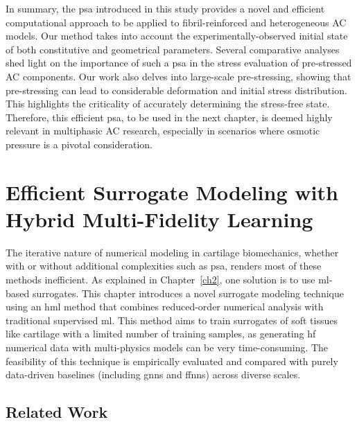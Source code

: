 In summary, the \ac{psa} introduced in this study provides a novel and efficient computational approach to be applied to fibril-reinforced and heterogeneous AC models. Our method takes into account the experimentally-observed initial state of both constitutive and geometrical parameters. Several comparative analyses shed light on the importance of such a \ac{psa} in the stress evaluation of pre-stressed AC components. Our work also delves into large-scale pre-stressing, showing that pre-stressing can lead to considerable deformation and initial stress distribution. This highlights the criticality of accurately determining the stress-free state. Therefore, this efficient \ac{psa}, to be used in the next chapter, is deemed highly relevant in multiphasic AC research, especially in scenarios where osmotic pressure is a pivotal consideration.


\chapter{Efficient Surrogate Modeling with Hybrid Multi-Fidelity Learning}\label{ch4}

The iterative nature of numerical modeling in cartilage biomechanics, whether with or without additional complexities such as \ac{psa}, renders most of these methods inefficient. As explained in Chapter~\ref{ch2}, one solution is to use \ac{ml}-based surrogates. This chapter introduces a novel surrogate modeling technique using an \ac{hml} method that combines reduced-order numerical analysis with traditional supervised \ac{ml}. This method aims to train surrogates of soft tissues like cartilage with a limited number of training samples, as generating \ac{hf} numerical data with multi-physics models can be very time-consuming. The feasibility of this technique is empirically evaluated and compared with purely data-driven baselines (including \acp{gnn} and \acp{ffnn}) across diverse scales.

\section{Related Work}

